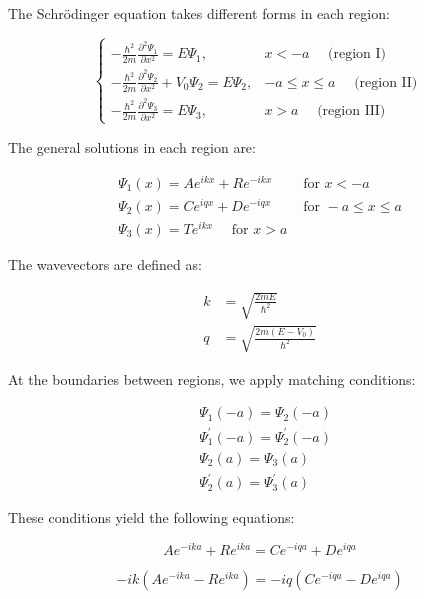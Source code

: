 \documentclass[italian]{HKNdocument}
\begin{document}
The Schrödinger equation takes different forms in each region:

\[
\begin{cases}-\frac{\hbar^{2}}{2 m} \frac{\partial^{2} \Psi_{1}}{\partial x^{2}}=E \Psi_{1}, & x<-a \quad \text { (region I) }  \\ -\frac{\hbar^{2}}{2 m} \frac{\partial^{2} \Psi_{2}}{\partial x^{2}}+V_{0} \Psi_{2}=E \Psi_{2}, & -a \leq x \leq a \quad \text { (region II) } \\ -\frac{\hbar^{2}}{2 m} \frac{\partial^{2} \Psi_{3}}{\partial x^{2}}=E \Psi_{3}, & x>a \quad \text { (region III) }\end{cases}
\]

The general solutions in each region are:

\[
\begin{array}{ll}
\Psi_{1}(x)=A e^{i k x}+R e^{-i k x} & \text { for } x<-a \\
\Psi_{2}(x)=C e^{i q x}+D e^{-i q x} & \text { for }-a \leq x \leq a  \\
\Psi_{3}(x)=T e^{i k x} \quad \text { for } x>a &
\end{array}
\]

The wavevectors are defined as:

\begin{align}
k & =\sqrt{\frac{2 m E}{\hbar^{2}}} \\
q & =\sqrt{\frac{2 m\left(E-V_{0}\right)}{\hbar^{2}}}
\end{align}

At the boundaries between regions, we apply matching conditions:

\begin{align}
& \Psi_{1}(-a)=\Psi_{2}(-a) \\
& \Psi_{1}^{\prime}(-a)=\Psi_{2}^{\prime}(-a) \\
& \Psi_{2}(a)=\Psi_{3}(a)  \\
& \Psi_{2}^{\prime}(a)=\Psi_{3}^{\prime}(a)
\end{align}

These conditions yield the following equations:

\begin{equation}
A e^{-i k a}+R e^{i k a}=C e^{-i q a}+D e^{i q a}
\end{equation}

\begin{equation}
-i k\left(A e^{-i k a}-R e^{i k a}\right)=-i q\left(C e^{-i q a}-D e^{i q a}\right)
\end{equation}
\end{document}

